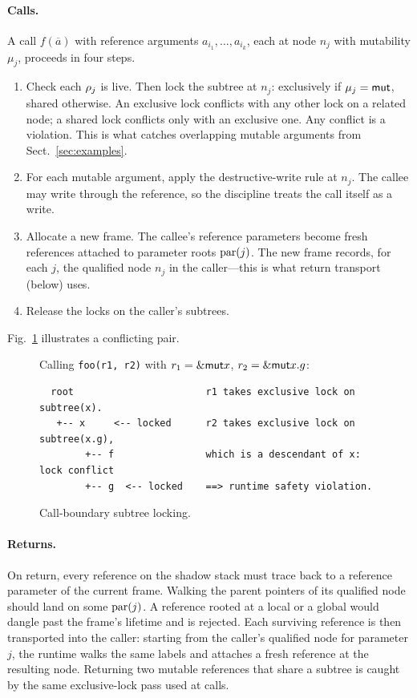 \paragraph{Calls.}
A call $f(\overline{a})$ with reference arguments
$a_{i_1}, \ldots, a_{i_k}$, each at node $n_j$ with mutability
$\mu_j$, proceeds in four steps.
\begin{enumerate}
\item Check each $\rho_{j}$ is live. Then lock the subtree at $n_j$:
exclusively if $\mu_j = \mathsf{mut}$, shared otherwise. An exclusive lock
conflicts with any other lock on a related node; a shared lock
conflicts only with an exclusive one. Any conflict is a violation.
This is what catches overlapping mutable arguments from
Sect.~\ref{sec:examples}.
\item For each mutable argument, apply the destructive-write rule at
$n_j$. The callee may write through the reference, so the discipline
treats the call itself as a write.
\item Allocate a new frame. The callee's reference parameters become
fresh references attached to parameter roots $\mathrm{par}(j)$. The new
frame records, for each $j$, the qualified node $n_j$ in the
caller---this is what return transport (below) uses.
\item Release the locks on the caller's subtrees.
\end{enumerate}
Fig.~\ref{fig:lock} illustrates a conflicting pair.
\begin{figure}[h]
\centering
\begin{minipage}{0.92\textwidth}\small
Calling \texttt{foo(r1, r2)} with $r_1 = \&\mathsf{mut} x$, $r_2 = \&\mathsf{mut} x.g$:
\begin{verbatim}
  root                       r1 takes exclusive lock on subtree(x).
   +-- x     <-- locked      r2 takes exclusive lock on subtree(x.g),
        +-- f                which is a descendant of x: lock conflict
        +-- g  <-- locked    ==> runtime safety violation.
\end{verbatim}
\end{minipage}
\caption{Call-boundary subtree locking.}\label{fig:lock}
\end{figure}

\paragraph{Returns.}
On return, every reference on the shadow stack must trace back to a
reference parameter of the current frame. Walking the parent pointers
of its qualified node should land on some $\mathrm{par}(j)$. A reference
rooted at a local or a global would dangle past the frame's lifetime
and is rejected. Each surviving reference is then transported into
the caller: starting from the caller's qualified node for parameter
$j$, the runtime walks the same labels and attaches a fresh reference
at the resulting node. Returning two mutable references that share a
subtree is caught by the same exclusive-lock pass used at calls.

